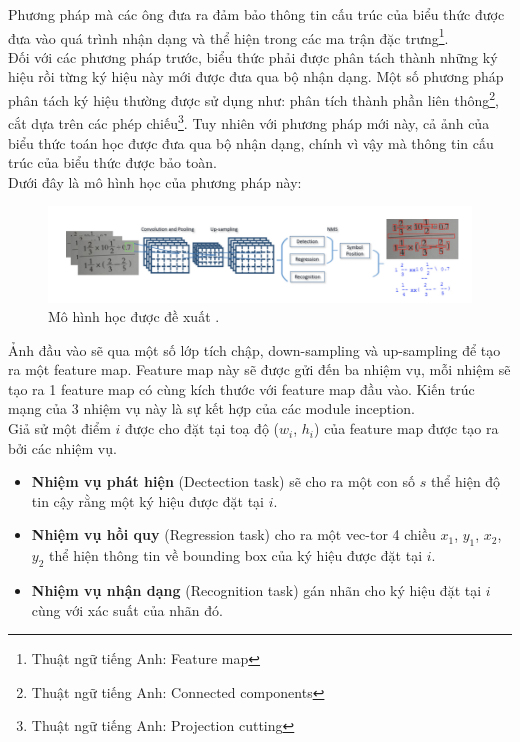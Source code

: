\documentclass[a4paper]{article}
\theoremstyle{definition}
\begin{document}
	Phương pháp mà các ông đưa ra đảm bảo thông tin cấu trúc của biểu thức được đưa vào quá trình nhận dạng và thể hiện trong các ma trận đặc trưng\footnote{Thuật ngữ tiếng Anh: Feature map}\cite{yanlecun}. \\
	Đối với các phương pháp trước, biểu thức phải được phân tách thành những ký hiệu rồi từng ký hiệu này mới được đưa qua bộ nhận dạng. Một số phương pháp phân tách ký hiệu thường được sử dụng như: phân tích thành phần liên thông\footnote{Thuật ngữ tiếng Anh: Connected components}, cắt dựa trên các phép chiếu\footnote{Thuật ngữ tiếng Anh: Projection cutting}\cite{segment}. Tuy nhiên với phương pháp mới này, cả ảnh của biểu thức toán học được đưa qua bộ nhận dạng, chính vì vậy mà thông tin cấu trúc của biểu thức được bảo toàn. \\
	
	Dưới đây là mô hình học của phương pháp này:\\
	
	\begin{figure}[!h]
		\centering
		\includegraphics[width=0.9\linewidth]{context_aware.png}
		\vspace{0.2cm}
		\caption{Mô hình học được đề xuất \cite{context}.}
		
	\end{figure}
	
	Ảnh đầu vào sẽ qua một số lớp tích chập, down-sampling và up-sampling để tạo ra một feature map. Feature map này sẽ được gửi đến ba nhiệm vụ, mỗi nhiệm sẽ tạo ra 1 feature map có cùng kích thước với feature map đầu vào. Kiến trúc mạng của 3 nhiệm vụ này là sự kết hợp của các module inception\cite{context}. \\
	Giả sử một điểm $i$ được cho đặt tại toạ độ ($w_i$, $h_i$) của feature map được tạo ra bởi các nhiệm vụ. 
	\begin{itemize}
		\item \textbf{Nhiệm vụ phát hiện} (Dectection task) sẽ cho ra một con số $s$ thể hiện độ tin cậy rằng một ký hiệu được đặt tại $i$.
		\item \textbf{Nhiệm vụ hồi quy} (Regression task) cho ra một vec-tor 4 chiều {$x_1$, $y_1$, $x_2$, $y_2$} thể hiện thông tin về bounding box của ký hiệu được đặt tại $i$.
		\item\textbf{Nhiệm vụ nhận dạng} (Recognition task) gán nhãn cho ký hiệu đặt tại $i$ cùng với xác suất của nhãn đó. 
	\end{itemize}
	
\end{document}
